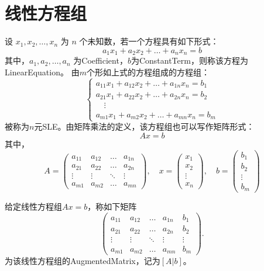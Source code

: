 \section{线性方程组}
\begin{definition}
	设 $x_1, x_2, \dots, x_n$ 为 $n$ 个未知数，若一个方程具有如下形式：
	\[
	a_1 x_1 + a_2 x_2 + \dots + a_n x_n = b
	\]
	其中，$a_1, a_2, \dots, a_n$ 为\gls{Coefficient}，$b$为\gls{ConstantTerm}，则称该方程为\gls{LinearEquation}。
	由$m$个形如上式的方程组成的方程组：
	\[
	\begin{cases}
		a_{11} x_1 + a_{12} x_2 + \dots + a_{1n} x_n = b_1 \\
		a_{21} x_1 + a_{22} x_2 + \dots + a_{2n} x_n = b_2 \\
		\quad \vdots \\
		a_{m1} x_1 + a_{m2} x_2 + \dots + a_{mn} x_n = b_m
	\end{cases}
	\]
	被称为$n$元\gls{SLE}。由矩阵乘法的定义，该方程组也可以写作矩阵形式：
	\[
	Ax=b
	\]
	其中，
	\[
	A =
	\begin{pmatrix}
		a_{11} & a_{12} & \dots & a_{1n} \\
		a_{21} & a_{22} & \dots & a_{2n} \\
		\vdots & \vdots & \ddots & \vdots \\
		a_{m1} & a_{m2} & \dots & a_{mn}
	\end{pmatrix}, \quad
	x =
	\begin{pmatrix}
		x_1 \\ x_2 \\ \vdots \\ x_n
	\end{pmatrix}, \quad
	b =
	\begin{pmatrix}
		b_1 \\ b_2 \\ \vdots \\ b_m
	\end{pmatrix}
	\]
\end{definition}
\begin{definition}
	给定线性方程组$Ax=b$，称如下矩阵
	\[
	\begin{pmatrix}
		a_{11} & a_{12} & \dots & a_{1n} & b_1 \\
		a_{21} & a_{22} & \dots & a_{2n} & b_2 \\
		\vdots & \vdots & \ddots & \vdots & \vdots \\
		a_{m1} & a_{m2} & \dots & a_{mn} & b_m
	\end{pmatrix}.
	\]
	为该线性方程组的\gls{AugmentedMatrix}，记为$[A|b]$。
\end{definition}
